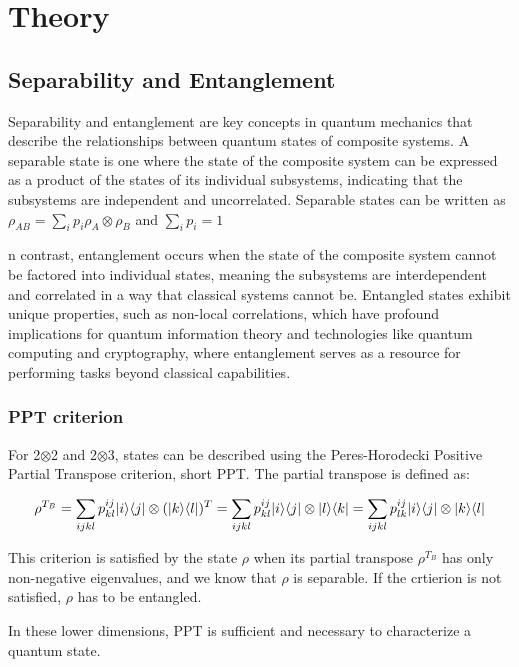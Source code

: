 \chapter{Theory}


\section{Separability and Entanglement}

Separability and entanglement are key concepts in quantum mechanics that describe the relationships between quantum states of composite systems. A separable state is one where the state of the composite system can be 
expressed as a product of the states of its individual subsystems, indicating that the subsystems are independent and uncorrelated. Separable states can be written as $\rho_{AB} = \sum_{i} p_i \rho_A \otimes \rho_B$ and $\sum_{i} p_i = 1$

n contrast, entanglement occurs when the state of the composite system cannot be 
factored into individual states, meaning the subsystems are interdependent and correlated in a way that classical systems cannot be. Entangled states exhibit unique properties, such as non-local correlations, which have 
profound implications for quantum information theory and technologies like quantum computing and cryptography, where entanglement serves as a resource for performing tasks beyond classical capabilities.

\subsection{PPT criterion}

For 2$\otimes$2 and 2$\otimes$3, states can be described using the Peres-Horodecki Positive Partial Transpose criterion, short PPT.
The partial transpose is defined as:

\begin{equation}
    \rho^{T_B} = \sum_{ijkl} p_{kl}^{ij} \lvert i\rangle\langle j\rvert \otimes (\lvert k\rangle\langle l\rvert)^T = \sum_{ijkl} p_{kl}^{ij} \lvert i\rangle\langle j\rvert \otimes \lvert l\rangle\langle k\rvert = \sum_{ijkl} p_{lk}^{ij} \lvert i\rangle\langle j\rvert \otimes \lvert k\rangle\langle l\rvert
\end{equation}

This criterion is satisfied by the state $\rho$ when its partial transpose $\rho^{T_B}$ has only non-negative eigenvalues, and we know that $\rho$ is separable. If the crtierion is not satisfied, $\rho$ has to be entangled.

In these lower dimensions, PPT is sufficient and necessary to characterize a quantum state.\\

